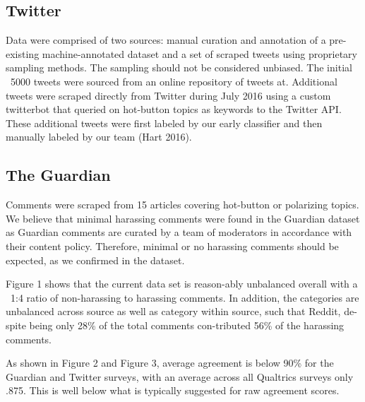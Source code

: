 \documentclass[11pt,a4paper]{article}
\begin{document}
\subsection{Twitter}
Data were comprised of two sources: manual curation
and annotation of a pre-existing machine-annotated
dataset and a set of scraped tweets using
proprietary sampling methods. The sampling
should not be considered unbiased. The initial
~5000 tweets were sourced from an online repository
of tweets at. Additional tweets were scraped
directly from Twitter during July 2016 using a custom
twitterbot that queried on hot-button topics as
keywords to the Twitter API. These additional
tweets were first labeled by our early classifier and
then manually labeled by our team (Hart 2016).

\subsection{The Guardian}
Comments were scraped from 15 articles covering
hot-button or polarizing topics. We believe that
minimal harassing comments were found in the
Guardian dataset as Guardian comments are curated
by a team of moderators in accordance with
their content policy. Therefore, minimal or no harassing
comments should be expected, as we confirmed
in the dataset.

Figure 1 shows that the current data set is reason-ably unbalanced overall with a ~1:4 ratio of non-harassing to harassing comments. In addition, the categories are unbalanced across source as well as category within source, such that Reddit, de-spite being only 28\% of the total comments con-tributed 56\% of the harassing comments.

As shown in Figure 2 and Figure 3, average agreement
is below 90\% for the Guardian and Twitter
surveys, with an average across all Qualtrics surveys
only .875. This is well below what is typically
suggested for raw agreement scores.
\end{document}
